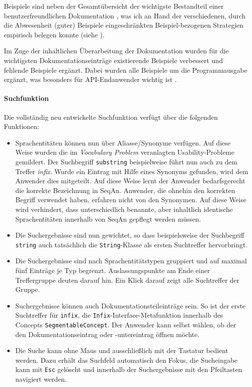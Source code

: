 Beispiele sind neben der Gesamtübersicht der wichtigste Bestandteil einer benutzerfreundlichen Dokumentation \citep{Robillard:2010bh}, was ich an Hand der verschiedenen, durch die Abwesenheit (guter) Beispiele eingeschränkten Beispiel-bezogenen Strategien empirisch belegen konnte (siehe ).

Im Zuge der inhaltlichen Überarbeitung der Dokumentation wurden für die wichtigsten Dokumentationseinträge existierende Beispiele verbessert und fehlende Beispiele ergänzt. Dabei wurden alle Beispiele um die Programmausgabe ergänzt, was besonders für API-Endanwender wichtig ist \citep{Gross:2010iz}.



\paragraph{Suchfunktion}

Die vollständig neu entwickelte Suchfunktion verfügt über die folgenden Funktionen:
\begin{itemize}
  \item Sprachentitäten können nun über Aliasse/Synonyme verfügen. Auf diese Weise wurden die im \textit{Vocabulary Problem} \citep{Furnas:1987hl} veranlagten Usability-Probleme gemildert. Der Suchbegriff \texttt{substring} beispielweise führt nun auch zu dem Treffer \textit{infix}. Wurde ein Eintrag mit Hilfe eines Synonyms gefunden, wird dem Anwender dies mitgeteilt. Auf diese Weise lernt der Anwender bedarfsgerecht die korrekte Bezeichnung in SeqAn. Anwender, die ohnehin den korrekten Begriff verwendet haben, erfahren nicht von den Synonymen. Auf diese Weise wird verhindert, dass unterschiedlich benannte, aber inhaltlich identische Sprachentitäten innerhalb von SeqAn gepflegt werden müssen.
  \item Die Suchergebnisse sind nun gewichtet, so dass beispielsweise der Suchbegriff \texttt{string} auch tatsächlich die \texttt{String}-Klasse als ersten Suchtreffer hervorbringt.
  \item Die Suchergebnisse sind nach Sprachentitätstypen gruppiert und auf maximal fünf Einträge je Typ begrenzt. Auslassungspunkte am Ende einer Treffergruppe deuten darauf hin. Ein Klick darauf zeigt alle Suchtreffer der Gruppe.
  \item Suchergebnisse können auch Dokumentationsteileinträge sein. So ist der erste Suchtreffer für \texttt{infix}, die \texttt{Infix}-Interface-Metafunktion innerhalb des Concepts \texttt{SegmentableConcept}. Der Anwender kann selbst wählen, ob der den Dokumentationseintrag oder -untereintrag öffnen möchte.
  \item Die Suche kann ohne Maus und ausschließlich mit der Tastatur bedient werden. Dazu erhält das Suchfeld automatisch den Fokus, die Sucheingabe kann mit \texttt{Esc} gelöscht und innerhalb der Suchergebnisse mit den Pfeiltasten navigiert werden.
\end{itemize}

